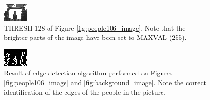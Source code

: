 \documentclass[a4paper, 10pt, titlepage]{article}
\begin{document}
\begin{figure}[!htb]
    \centering
    \includegraphics[width=0.45\linewidth]{processor_test_thresh_128.png}
    \caption{THRESH 128 of Figure \ref{fig:people106_image}. Note that the brighter parts of the image have been set to MAXVAL (255).}
    \label{fig:thresh_image}
\end{figure}

\begin{figure}[!htb]
    \centering
    \includegraphics[width=0.45\linewidth]{processor_test_edge_detector.png}
    \caption{Result of edge detection algorithm performed on Figures \ref{fig:people106_image} and \ref{fig:background_image}. Note the correct identification of the edges of the people in the picture.}
    \label{fig:edge_detect_image}
\end{figure}
\end{document}
